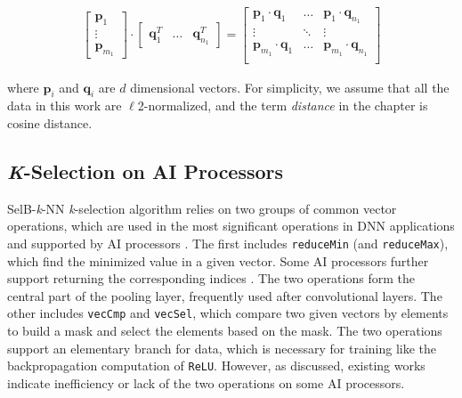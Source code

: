 \documentclass[12pt]{extbook}
\begin{document}
\begin{equation}
    \label{eq:dot_products}
    \begin{aligned}
    \begin{bmatrix} 
        \boldsymbol{p}_{1} \\
        \vdots \\
        \boldsymbol{p}_{m_1}
    \end{bmatrix}
    \cdot
    \begin{bmatrix} 
        \boldsymbol{q}_{1}^{T} &
        \dots &
        \boldsymbol{q}_{n_1}^{T}
    \end{bmatrix}
    =
    \begin{bmatrix} 
        \boldsymbol{p}_{1} \cdot \boldsymbol{q}_{1} &
        \dots &
        \boldsymbol{p}_{1} \cdot \boldsymbol{q}_{n_1} \\
        \vdots & \ddots & \vdots \\
        \boldsymbol{p}_{m_1} \cdot \boldsymbol{q}_{1} &
        \dots &
        \boldsymbol{p}_{m_1} \cdot \boldsymbol{q}_{n_1} \\
    \end{bmatrix}
    \end{aligned}
    \end{equation}

where $\boldsymbol{p}_{i}$ and $\boldsymbol{q}_{i}$ are $d$ dimensional vectors. For simplicity, we assume that all the data in this work are $\ell$2-normalized, and the term \textit{distance} in the chapter is cosine distance.

\subsection{\textit{K}-Selection on AI Processors}

SelB-\textit{k}-NN \textit{k}-selection algorithm relies on two groups of common vector operations, which are used in the most significant operations in DNN applications and supported by AI processors \cite{CANN, jax, cambricon}. The first includes \verb|reduceMin| (and \verb|reduceMax|), which find the minimized value in a given vector. Some AI processors further support returning the corresponding indices \cite{CANN}. The two operations form the central part of the pooling layer, frequently used after convolutional layers. The other includes \verb|vecCmp| and \verb|vecSel|, which compare two given vectors by elements to build a mask and select the elements based on the mask. The two operations support an elementary branch for data, which is necessary for training like the backpropagation computation of \verb|ReLU|. However, as discussed, existing works \cite{DBLP:conf/icpp/JiW21, cambricon, CANN} indicate inefficiency or lack of the two operations on some AI processors.
\end{document}
